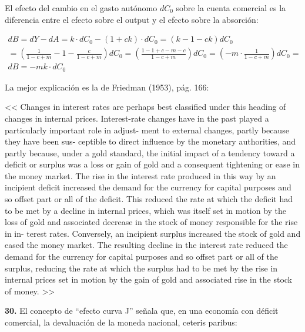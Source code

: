 \documentclass{nuevotema}
\begin{document}
\conceptos


El efecto del cambio en el gasto autónomo $d C_0$ sobre la cuenta comercial es la diferencia entre el efecto sobre el output y el efecto sobre la absorción:

\begin{align*}
d B = d Y - d A = k \cdot d C_0 - (1+ck) \cdot d C_0 = (k - 1 - ck) d C_0 \\
= \left( \frac{1}{1-c+m} - 1 - \frac{c}{1-c+m}\right) d C_0 = \left( \frac{1-1+c-m - c}{1-c+m}\right) d C_0 = \left( -m \cdot \frac{1}{1-c+m} \right) d C_0 = \\
d B = -m k \cdot d C_0
\end{align*}


La mejor explicación es la de Friedman (1953), pág. 166:

<< Changes in interest rates are perhaps best classified under
this heading of changes in internal prices. Interest-rate changes
have in the past played a particularly important role in adjust-
ment to external changes, partly because they have been sus-
ceptible to direct influence by the monetary authorities, and
partly because, under a gold standard, the initial impact of a
tendency toward a deficit or surplus was a loss or gain of gold
and a consequent tightening or ease in the money market. The
rise in the interest rate produced in this way by an incipient
deficit increased the demand for the currency for capital purposes
and so offset part or all of the deficit. This reduced the rate at
which the deficit had to be met by a decline in internal prices,
which was itself set in motion by the loss of gold and associated
decrease in the stock of money responsible for the rise in in-
terest rates. Conversely, an incipient surplus increased the stock
of gold and eased the money market. The resulting decline in
the interest rate reduced the demand for the currency for capital
purposes and so offset part or all of the surplus, reducing the
rate at which the surplus had to be met by the rise in internal
prices set in motion by the gain of gold and associated rise in
the stock of money. >>

\preguntas


\textbf{30.} El concepto de ``efecto curva J'' señala que, en una economía con déficit comercial, la devaluación de la moneda nacional, ceteris paribus:
\end{document}

